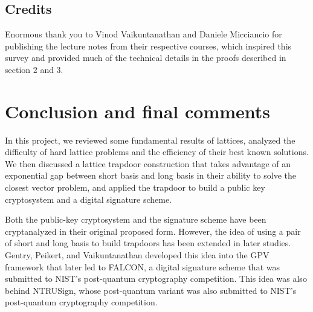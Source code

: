 \documentclass[letterpaper,12pt]{article}
\begin{document}
\subsection{Credits}
Enormous thank you to Vinod Vaikuntanathan\cite{mit-cs294} and Daniele Micciancio\cite{ucsd-cse206a} for publishing the lecture notes from their respective courses, which inspired this survey and provided much of the technical details in the proofs described in section 2 and 3.

% 



\section{Conclusion and final comments}
In this project, we reviewed some fundamental results of lattices, analyzed the difficulty of hard lattice problems and the efficiency of their best known solutions. We then discussed a lattice trapdoor construction that takes advantage of an exponential gap between short basis and long basis in their ability to solve the closest vector problem, and applied the trapdoor to build a public key cryptosystem and a digital signature scheme.

Both the public-key cryptosystem and the signature scheme have been cryptanalyzed \cite{nguyen1999cryptanalysis}\cite{nguyen2006learning} in their original proposed form. However, the idea of using a pair of short and long basis to build trapdoors has been extended in later studies. Gentry, Peikert, and Vaikuntanathan developed this idea into the GPV framework\cite{gentry2008trapdoors} that later led to FALCON, a digital signature scheme that was submitted to NIST's post-quantum cryptography competition. This idea was also behind NTRUSign\cite{hoffstein2003ntrusign}, whose post-quantum variant was also submitted to NIST's post-quantum cryptography competition.



\end{document}
